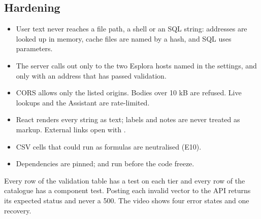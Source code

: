 \subsection{Hardening}

\begin{itemize}
  \item User text never reaches a file path, a shell or an SQL string: addresses are looked up
    in memory, cache files are named by a hash, and SQL uses parameters.
  \item The server calls out only to the two Esplora hosts named in the settings, and only with an
    address that has passed validation.
  \item CORS allows only the listed origins. Bodies over 10 kB are refused. Live lookups and the
    Assistant are rate-limited.
  \item React renders every string as text; labels and notes are never treated as markup. External
    links open with .
  \item CSV cells that could run as formulas are neutralised (E10).
  \item Dependencies are pinned;  and  run before the code freeze.
\end{itemize}

\begin{done}
Every row of the validation table has a test on each tier and every row of the catalogue has a
component test. Posting each invalid vector to the API returns its expected status and never a 500.
The video shows four error states and one recovery.
\end{done}
